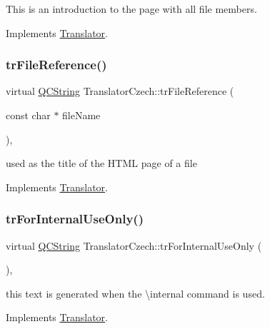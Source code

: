 This is an introduction to the page with all file members. 

Implements \mbox{\hyperlink{class_translator}{Translator}}.

\mbox{\label{class_translator_czech_a72e7c6f87ad0307a9e3b9897861bfa0c}} 
\subsubsection{\texorpdfstring{trFileReference()}{trFileReference()}}
{\footnotesize\ttfamily virtual \mbox{\hyperlink{class_q_c_string}{Q\+C\+String}} Translator\+Czech\+::tr\+File\+Reference (\begin{DoxyParamCaption}\item[{const char $\ast$}]{file\+Name }\end{DoxyParamCaption})\hspace{0.3cm}{\ttfamily [inline]}, {\ttfamily [virtual]}}

used as the title of the H\+T\+ML page of a file 

Implements \mbox{\hyperlink{class_translator}{Translator}}.

\mbox{\label{class_translator_czech_a05f0dd3e603941799e2ce56616850d4c}} 
\subsubsection{\texorpdfstring{trForInternalUseOnly()}{trForInternalUseOnly()}}
{\footnotesize\ttfamily virtual \mbox{\hyperlink{class_q_c_string}{Q\+C\+String}} Translator\+Czech\+::tr\+For\+Internal\+Use\+Only (\begin{DoxyParamCaption}{ }\end{DoxyParamCaption})\hspace{0.3cm}{\ttfamily [inline]}, {\ttfamily [virtual]}}

this text is generated when the \textbackslash{}internal command is used. 

Implements \mbox{\hyperlink{class_translator}{Translator}}.

\mbox{\label{class_translator_czech_a46d5702c25567bff0e62944c37010ead}} 
